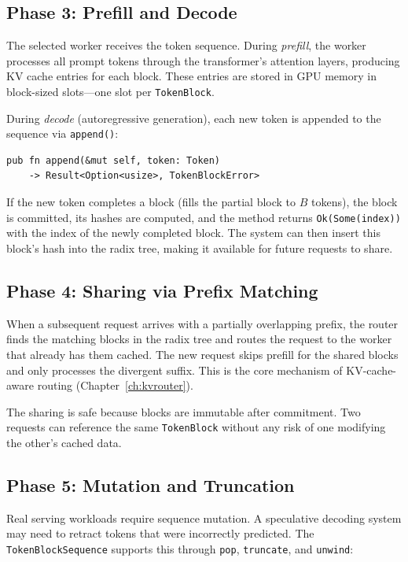 \subsection{Phase 3: Prefill and Decode}

The selected worker receives the token sequence. During \emph{prefill}, the worker processes all prompt tokens through the transformer's attention layers, producing KV cache entries for each block. These entries are stored in GPU memory in block-sized slots---one slot per \texttt{TokenBlock}.

During \emph{decode} (autoregressive generation), each new token is appended to the sequence via \texttt{append()}:

\begin{verbatim}
pub fn append(&mut self, token: Token)
    -> Result<Option<usize>, TokenBlockError>
\end{verbatim}

If the new token completes a block (fills the partial block to $B$ tokens), the block is committed, its hashes are computed, and the method returns \texttt{Ok(Some(index))} with the index of the newly completed block. The system can then insert this block's hash into the radix tree, making it available for future requests to share.

\subsection{Phase 4: Sharing via Prefix Matching}

When a subsequent request arrives with a partially overlapping prefix, the router finds the matching blocks in the radix tree and routes the request to the worker that already has them cached. The new request skips prefill for the shared blocks and only processes the divergent suffix. This is the core mechanism of KV-cache-aware routing (Chapter~\ref{ch:kvrouter}).

The sharing is safe because blocks are immutable after commitment. Two requests can reference the same \texttt{TokenBlock} without any risk of one modifying the other's cached data.

\subsection{Phase 5: Mutation and Truncation}

Real serving workloads require sequence mutation. A speculative decoding system may need to retract tokens that were incorrectly predicted. The \texttt{TokenBlockSequence} supports this through \texttt{pop}, \texttt{truncate}, and \texttt{unwind}:

